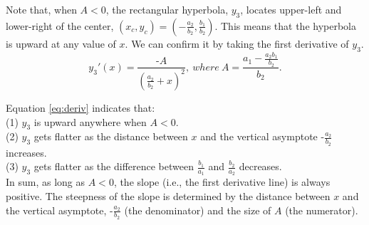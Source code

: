 \documentclass[11pt, a4paper]{article}
\begin{document}
\noindent
Note that, when $A<0$, the rectangular hyperbola, $y_3$, locates upper-left and lower-right of the center, $(x_c, y_c) = (-\frac{a_2}{b_2}, \frac{b_1}{b_2})$. This means that the hyperbola is upward at any value of $x$. We can confirm it by  taking the first derivative of $y_3$.\\


\noindent
\begin{equation}
\label{eq:deriv}
y_3'(x)=\frac{\mbox{-}A}{(\frac{a_2}{b_2}+x)^2},~where~A = \frac{a_1-\frac{a_2 b_1}{b_2}}{b_2}.
\end{equation}

\noindent
Equation \ref{eq:deriv} indicates that:\\ 
(1) $y_3$ is upward anywhere when $A<0$.\\
(2) $y_3$ gets flatter as the distance between $x$ and the vertical asymptote $\mbox{-}\frac{a_2}{b_2}$ increases.\\
(3) $y_3$ gets flatter as the difference between $\frac{b_1}{a_1}$ and $\frac{b_2}{a_2}$ decreases.\\%

\noindent
In sum, as long as $A<0$, the slope (i.e., the first derivative line) is always positive. The steepness of the slope is determined by the distance between $x$ and the vertical asymptote, $\mbox{-}\frac{a_2}{b_2}$ (the denominator) and the size of $A$ (the numerator).\\
\end{document}

